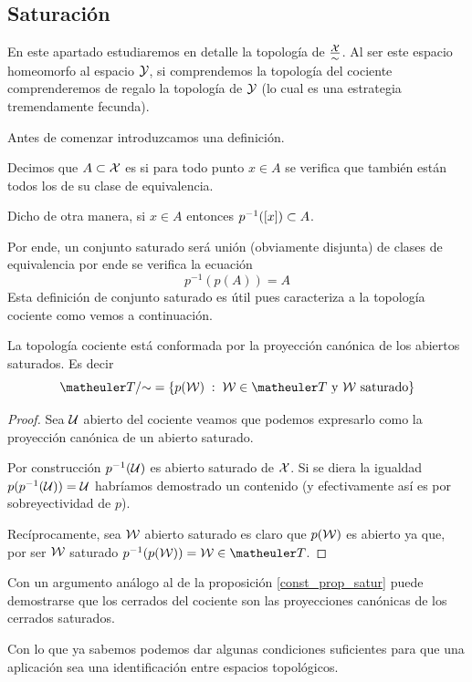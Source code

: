 \subsection{Saturación}
En este apartado estudiaremos en detalle la topología de $\frac{\mathcal{X}}{\sim}$. Al ser este espacio homeomorfo al espacio $\mathcal{Y}$, si comprendemos la topología del cociente comprenderemos de regalo la topología de $\mathcal{Y}$ (lo cual es una estrategia tremendamente fecunda).

Antes de comenzar introduzcamos una definición.
\begin{defi}
	Decimos que $A\subset\mathcal{X}$ es  si para todo punto $x\in A$ se verifica que también están todos los de su clase de equivalencia.
	
	Dicho de otra manera, si $x\in A$ entonces $p^{-1}(\left [ x \right ])\subset A$.
\end{defi}

Por ende, un conjunto saturado será unión (obviamente disjunta) de clases de equivalencia por ende se verifica la ecuación
\begin{equation}
p^{-1}(p(A))= A
\end{equation}
Esta definición de conjunto saturado es útil pues caracteriza a la topología cociente como vemos a continuación.
\begin{prop}
	\label{const_prop_satur}
	La topología cociente está conformada por la proyección canónica de los abiertos saturados. Es decir
	\[\T/\mathord{\sim} = \{p(\W)\midc \W\in\T\text{ y }\W\text{ saturado}\}\]
\end{prop}
\begin{proof}
	Sea $\mathcal{U}$ abierto del cociente veamos que podemos expresarlo como la proyección canónica de un abierto saturado.
	
	Por construcción $p^{-1}(\mathcal{U})$ es abierto saturado de $\mathcal{X}$. Si se diera la igualdad $p(p^{-1}(\mathcal{U}))=\mathcal{U}$ habríamos demostrado un contenido (y efectivamente así es por sobreyectividad de $p$).
	
	Recíprocamente, sea $\mathcal{W}$ abierto saturado es claro que $p(\mathcal{W})$ es abierto ya que, por ser $\mathcal{W}$ saturado $p^{-1}(p(\W))=\W\in\T$.
\end{proof}
\begin{obs}
	Con un argumento análogo al de la proposición \ref{const_prop_satur} puede demostrarse que los cerrados del cociente son las proyecciones canónicas de los cerrados saturados. 
\end{obs}
Con lo que ya sabemos podemos dar algunas condiciones suficientes para que una aplicación sea una identificación entre espacios topológicos.

